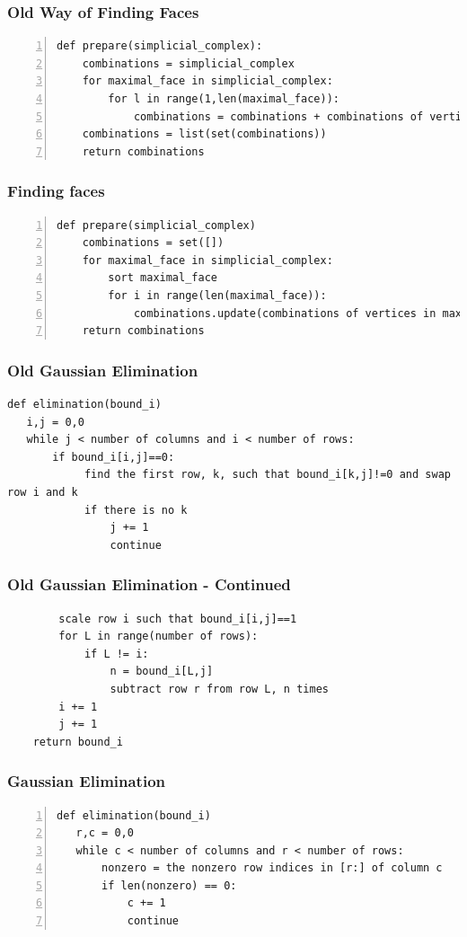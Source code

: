\documentclass{beamer}
\begin{document}
\begin{frame}[fragile]
\frametitle{Old Way of Finding Faces}
\begin{lstlisting}[numbers=left]
def prepare(simplicial_complex):
    combinations = simplicial_complex
    for maximal_face in simplicial_complex:
        for l in range(1,len(maximal_face)):
            combinations = combinations + combinations of vertices in maximal_face of length l
    combinations = list(set(combinations))
    return combinations
\end{lstlisting}
\end{frame}

\begin{frame}[fragile]
\frametitle{Finding faces}
\begin{lstlisting}[numbers=left]
def prepare(simplicial_complex)
    combinations = set([])
    for maximal_face in simplicial_complex:
    	sort maximal_face
        for i in range(len(maximal_face)):
            combinations.update(combinations of vertices in maximal_face of length i)
    return combinations    
\end{lstlisting}
\end{frame}

\begin{frame}[fragile]
\frametitle{Old Gaussian Elimination}
\begin{lstlisting}
def elimination(bound_i)
   i,j = 0,0
   while j < number of columns and i < number of rows:
       if bound_i[i,j]==0:
            find the first row, k, such that bound_i[k,j]!=0 and swap row i and k
            if there is no k
                j += 1
                continue
\end{lstlisting}
\end{frame}
\begin{frame}[fragile]
\frametitle{Old Gaussian Elimination - Continued}
\begin{lstlisting}
        scale row i such that bound_i[i,j]==1
        for L in range(number of rows):
            if L != i:
                n = bound_i[L,j]
                subtract row r from row L, n times
        i += 1
        j += 1
    return bound_i
\end{lstlisting}
\end{frame}

\begin{frame}[fragile]
\frametitle{Gaussian Elimination}
\begin{lstlisting}[numbers=left]
def elimination(bound_i)
   r,c = 0,0
   while c < number of columns and r < number of rows:
       nonzero = the nonzero row indices in [r:] of column c
       if len(nonzero) == 0:
           c += 1
           continue
\end{lstlisting}
\end{frame}
\end{document}
